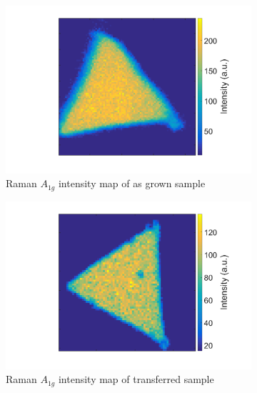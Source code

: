 \begin{figure}[ht]
\begin{center}
\begin{subfigure}[b]{0.4\textwidth}
			\includegraphics[scale=0.15]{Transfer/TransferRamanIntensityAMapAsgrown.png}
			\caption{Raman $A_{1g}$ intensity map of as grown sample}
			\label{fig:TransferRamanIntensityAMapAsgrown}
		\end{subfigure}
		\quad
		\begin{subfigure}[b]{0.4\textwidth}
			\includegraphics[scale=0.15]{Transfer/TransferRamanIntensityAMapTransferred.png}
			\caption{Raman $A_{1g}$ intensity map of transferred sample}
			\label{fig:TransferRamanIntensityAMapTransferred}
		\end{subfigure}
		\vfill
		\begin{subfigure}[b]{0.4\textwidth}

\end{subfigure}
\end{center}
\end{figure}
